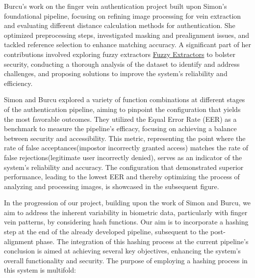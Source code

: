 Burcu's work on the finger vein authentication project built upon Simon's foundational pipeline, focusing on refining image processing for vein extraction and evaluating different distance calculation methods for authentication. She optimized preprocessing steps, investigated masking and prealignment issues, and tackled reference selection to enhance matching accuracy. A significant part of her contributions involved exploring fuzzy extractors \hyperref[def:Fuzzy_Extractors]{Fuzzy Extractors} to bolster security, conducting a thorough analysis of the dataset to identify and address challenges, and proposing solutions to improve the system's reliability and efficiency.

Simon and Burcu explored a variety of function combinations at different stages of the authentication pipeline, aiming to pinpoint the configuration that yields the most favorable outcomes. They utilized the Equal Error Rate (EER) as a benchmark to measure the pipeline's efficacy, focusing on achieving a balance between security and accessibility. This metric, representing the point where the rate of false acceptances(impostor incorrectly granted access) matches the rate of false rejections(legitimate user incorrectly denied), serves as an indicator of the system's reliability and accuracy. The configuration that demonstrated superior performance, leading to the lowest EER and thereby optimizing the process of analyzing and processing images, is showcased in the subsequent figure.


In the progression of our project, building upon the work of Simon and Burcu, we aim to address the inherent variability in biometric data, particularly with finger vein patterns, by considering hash functions. Our aim is to incorporate a hashing step at the end of the already developed pipeline, subsequent to the post-alignment phase. The integration of this hashing process at the current pipeline's conclusion is aimed at achieving several key objectives, enhancing the system's overall functionality and security. The purpose of employing a hashing process in this system is multifold:

